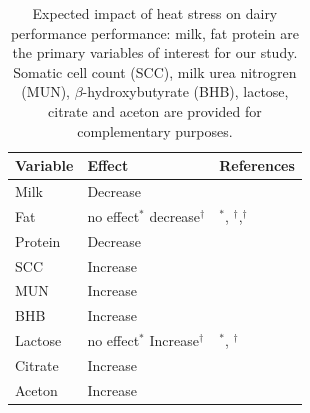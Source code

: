 \begin{table}[H]
    \centering
    \begin{tabular}{lll}
    \textbf{Variable} & \textbf{Effect} & \textbf{References} \\
    \midrule
    \midrule
    Milk & Decrease & \cite{ahmed_temperature_2022, gisbert-queral_climate_2021} \\
    \hline
    Fat & \multrow{no effect$^*$ \\ decrease$^\dag$} &  \cite{vroege_effects_2023}$^*$, \cite{moore_how_2023}$^\dag$,\cite{ vinet_estimation_2023}$^\dag$\\
    \hline
    Protein & Decrease & \cite{gao_effects_2017, vinet_estimation_2023} \\
    \hline
    \hline
    SCC & Increase & \cite{hammami_evaluation_2013,lievaart_effect_2007} \\
    \hline
    MUN & Increase & \cite{gao_effects_2017} \\
    \hline
    BHB & Increase & \cite{stefanska_effect_2024} \\
    \hline
    Lactose & \multrow{no effect$^*$ \\ Increase$^\dag$} & \cite{kadzere_heat_2002}$^*$, \cite{moore_how_2023}$^\dag$\\
    \hline
    Citrate & Increase & \cite{tian_integrated_2016} \\
    \hline
    Aceton & Increase & \cite{tian_integrated_2016} \\
    \bottomrule
    \end{tabular}
    \caption{Expected impact of heat stress on dairy performance performance: milk, fat protein are the primary variables of interest for our study. Somatic cell count (SCC), milk urea nitrogren (MUN), $\beta$-hydroxybutyrate (BHB), lactose, citrate and aceton are provided for complementary purposes.}
    \label{table:heat_stress_expected_effects}
\end{table}

